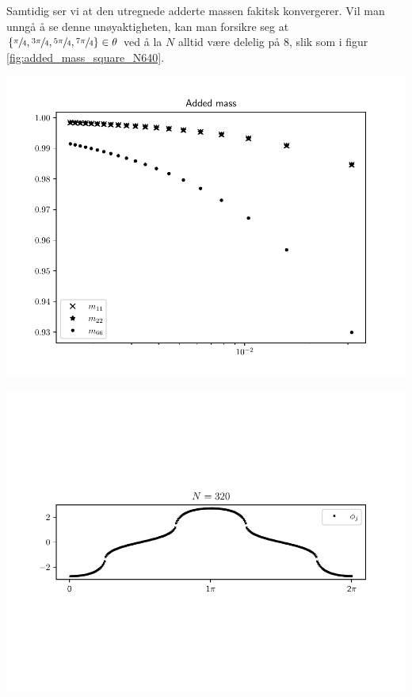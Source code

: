 \noindent Samtidig ser vi at den utregnede adderte massen fakitsk konvergerer.
Vil man unngå å se denne unøyaktigheten, kan man forsikre seg at $\{ \sfrac{\pi}{4}, \sfrac{3\pi}{4}, \sfrac{5\pi}{4}, \sfrac{7\pi}{4} \} \in \theta$ ved å la $N$ alltid være delelig på 8, slik som i figur \ref{fig:added_mass_square_N640}.
\begin{Figure}
    \centering
    \captionsetup{type = figure}
    \includegraphics[width = \linewidth]{addedmass_square_N640.pdf}
    \label{fig:added_mass_square_N640}
\end{Figure}
\begin{Figure}
    \centering
    \captionsetup{type = figure}
    \includegraphics[width = \textwidth]{phi1_N320.pdf}
    \label{fig:phi1_square_N320}
\end{Figure}
